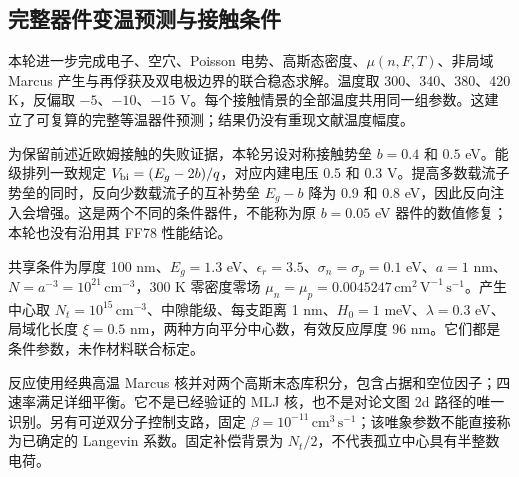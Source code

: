 \subsection{{\cjkfont 完整器件变温预测与接触条件}\allowbreak{}}
{\cjkfont 本轮进一步完成电子、空穴、}\allowbreak{}Poisson {\cjkfont 电势、高斯态密度、}\allowbreak{}$\mu(n,F,T)${\cjkfont 、非局域}\allowbreak{} Marcus {\cjkfont 产生与再俘获及双电极边界的联合稳态求解。温度取}\allowbreak{} 300{\cjkfont 、}\allowbreak{}340{\cjkfont 、}\allowbreak{}380{\cjkfont 、}\allowbreak{}420 K{\cjkfont ，反偏取}\allowbreak{} $-5${\cjkfont 、}\allowbreak{}$-10${\cjkfont 、}\allowbreak{}$-15$ V{\cjkfont 。每个接触情景的全部温度共用同一组参数。这建立了可复算的完整等温器件预测；结果仍没有重现文献温度幅度。}\allowbreak{}

{\cjkfont 为保留前述近欧姆接触的失败证据，本轮另设对称接触势垒}\allowbreak{} $b=0.4$ {\cjkfont 和}\allowbreak{} $0.5$ eV{\cjkfont 。能级排列一致规定}\allowbreak{} $V_{\rm bi}=(E_g-2b)/q${\cjkfont ，对应内建电压}\allowbreak{} 0.5 {\cjkfont 和}\allowbreak{} 0.3 V{\cjkfont 。提高多数载流子势垒的同时，反向少数载流子的互补势垒}\allowbreak{} $E_g-b$ {\cjkfont 降为}\allowbreak{} 0.9 {\cjkfont 和}\allowbreak{} 0.8 eV{\cjkfont ，因此反向注入会增强。这是两个不同的条件器件，不能称为原}\allowbreak{} $b=0.05$ eV {\cjkfont 器件的数值修复；本轮也没有沿用其}\allowbreak{} FF78 {\cjkfont 性能结论。}\allowbreak{}

{\cjkfont 共享条件为厚度}\allowbreak{} 100 nm{\cjkfont 、}\allowbreak{}$E_g=1.3$ eV{\cjkfont 、}\allowbreak{}$\epsilon_r=3.5${\cjkfont 、}\allowbreak{}$\sigma_n=\sigma_p=0.1$ eV{\cjkfont 、}\allowbreak{}$a=1$ nm{\cjkfont 、}\allowbreak{}$N=a^{-3}=10^{21}\,\mathrm{cm^{-3}}${\cjkfont ，}\allowbreak{}300 K {\cjkfont 零密度零场}\allowbreak{} $\mu_n=\mu_p=0.0045247\,\mathrm{cm^2\,V^{-1}\,s^{-1}}${\cjkfont 。产生中心取}\allowbreak{} $N_t=10^{15}\,\mathrm{cm^{-3}}${\cjkfont 、中隙能级、每支距离}\allowbreak{} 1 nm{\cjkfont 、}\allowbreak{}$H_0=1$ meV{\cjkfont 、}\allowbreak{}$\lambda=0.3$ eV{\cjkfont 、局域化长度}\allowbreak{} $\xi=0.5$ nm{\cjkfont ，两种方向平分中心数，有效反应厚度}\allowbreak{} 96 nm{\cjkfont 。它们都是条件参数，未作材料联合标定。}\allowbreak{}

{\cjkfont 反应使用经典高温}\allowbreak{} Marcus {\cjkfont 核并对两个高斯末态库积分，包含占据和空位因子；四速率满足详细平衡。它不是已经验证的}\allowbreak{} MLJ {\cjkfont 核，也不是对论文图}\allowbreak{} 2d {\cjkfont 路径的唯一识别。另有可逆双分子控制支路，固定}\allowbreak{} $\beta=10^{-11}\,\mathrm{cm^3\,s^{-1}}${\cjkfont ；该唯象参数不能直接称为已确定的}\allowbreak{} Langevin {\cjkfont 系数。固定补偿背景为}\allowbreak{} $N_t/2${\cjkfont ，不代表孤立中心具有半整数电荷。}\allowbreak{}

